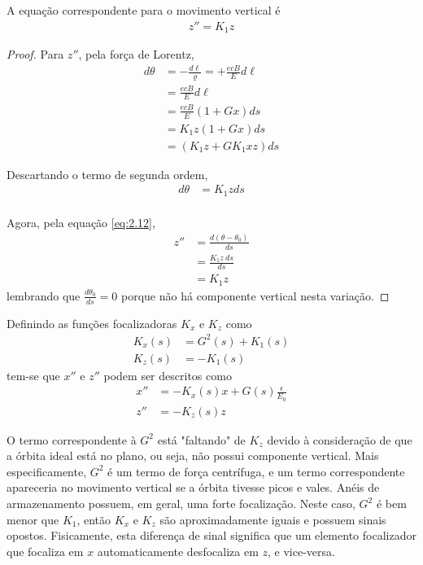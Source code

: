 A equação correspondente para o movimento vertical é
\begin{align}
	z'' = K_1 z
\end{align}

\begin{proof}
	Para $z''$, pela força de Lorentz,
	\begin{align*}
		d\theta &= -\frac{d\ell}{\varrho} = + \frac{ecB}{E}d\ell\\
				&= \frac{ecB}{E}d\ell\\
				&= \frac{ecB}{E}(1+Gx)ds\\
				&= K_1 z (1+Gx)ds\\
				& = (K_1 z + GK_1xz)ds
	\end{align*}
	
	Descartando o termo de segunda ordem,
	\begin{align*}
		d\theta &= K_1 z ds\\
	\end{align*}
	
	Agora, pela equação \eqref{eq:2.12},
	\begin{align*}
		z'' &= \frac{d(\theta-\theta_0)}{ds}\\
			&= \frac{K_1 z\ ds}{ds}\\
			&= K_1 z
	\end{align*}
	lembrando que $\frac{d\theta_0}{ds} = 0$ porque não há componente vertical nesta variação.
\end{proof}

Definindo as funções focalizadoras $K_x$ e $K_z$ como
\begin{align}
	K_x(s) &= G^2(s)+K_1(s)\label{eq:2.21}\\
	K_z(s) &= - K_1(s)
\end{align}
tem-se que $x''$ e $z''$ podem ser descritos como
\begin{align}
	x'' &= -K_x(s)x + G(s)\frac{\epsilon}{E_0}\label{eq:2.19}\\
	z'' &= -K_z(s)z\label{eq:2.20}
\end{align}

O termo correspondente à $G^2$ está "faltando" de $K_z$ devido à consideração de que a órbita ideal está no plano, ou seja, não possui componente vertical. Mais especificamente, $G^2$ é um termo de força centrífuga, e um termo correspondente apareceria no movimento vertical se a órbita tivesse picos e vales. Anéis de armazenamento possuem, em geral, uma forte focalização. Neste caso, $G^2$ é bem menor que $K_1$, então $K_x$ e $K_z$ são aproximadamente iguais e possuem sinais opostos. Fisicamente, esta diferença de sinal significa que um elemento focalizador que focaliza em $x$ automaticamente desfocaliza em $z$, e vice-versa.

